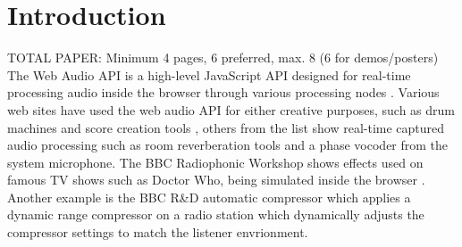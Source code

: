 \documentclass{article}
\title{\papertitle}
\begin{document}
%
\capstartfalse
\maketitle
\capstarttrue
%
\begin{abstract}
New functionality in HTML5, notably its Web Audio API, allow for increasingly powerful applications in the browser. %
Perceptual evaluation tests for audio, where the subject assesses certain qualities of different audio fragments through a graphical user interface and/or text boxes, require playback of audio and rapid switching between different files. %
The advantage of a web application is easy deployment on any platform, without requiring any other application or library, easy storing of results on a server. 
[...]

\end{abstract}
%

\section{Introduction}\label{sec:introduction}

TOTAL PAPER: Minimum 4 pages, 6 preferred, max. 8 (6 for demos/posters)\\ 


The Web Audio API is a high-level JavaScript API designed for real-time processing audio inside the browser through various processing nodes \cite{webaudioapi}. Various web sites have used the web audio API for either creative purposes, such as drum machines and score creation tools \cite{webaudiodemo}, %
others from the list show real-time captured audio processing such as room reverberation tools and a phase vocoder from the system microphone. The BBC Radiophonic Workshop shows effects used on famous TV shows such as Doctor Who, being simulated inside the browser \cite{bbcradiophonics}. %
Another example is the BBC R\&D automatic compressor which applies a dynamic range compressor on a radio station which dynamically adjusts the compressor settings to match the listener envrionment. %
\end{document}
